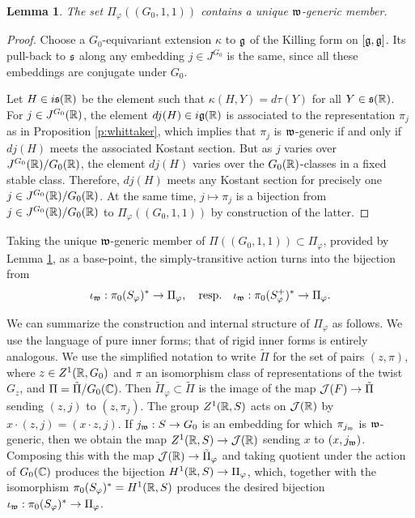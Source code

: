 \documentclass{article}
\newtheorem{lem}[thm]{Lemma}
\theoremstyle{definition}
\numberwithin{equation}{section}
\renewcommand{\-}{\hyp{}}
\begin{document}
\begin{lem} \label{lem:uniqgen}
The set $\Pi_\varphi((G_0,1,1))$ contains a unique $\mathfrak{w}$-generic member.
\end{lem}
\begin{proof}
Choose a $G_0$-equivariant extension $\kappa$ to $\mathfrak{g}$ of the Killing form on $[\mathfrak{g},\mathfrak{g}]$. Its pull-back to $\mathfrak{s}$ along any embedding $j \in J^{G_0}$ is the same, since all these embeddings are conjugate under $G_0$.

Let $H \in i\mathfrak{s}(\mathbb{R})$ be the element such that $\kappa(H,Y)=d\tau(Y)$ for all $Y \in \mathfrak{s}(\mathbb{R})$. For $j \in J^{G_0}(\mathbb{R})$, the element $dj(H) \in i\mathfrak{g}(\mathbb{R})$ is associated to the representation $\pi_j$ as in Proposition \ref{p:whittaker}, which implies that $\pi_j$ is $\mathfrak{w}$-generic if and only if $dj(H)$ meets the associated Kostant section. But as $j$ varies over $J^{G_0}(\mathbb{R})/G_0(\mathbb{R})$, the element $dj(H)$ varies over the $G_0(\mathbb{R})$-classes in a fixed stable class. Therefore, $dj(H)$ meets any Kostant section for precisely one $j \in J^{G_0}(\mathbb{R})/G_0(\mathbb{R})$. At the same time, $j \mapsto \pi_j$ is a bijection from $j \in J^{G_0}(\mathbb{R})/G_0(\mathbb{R})$ to $\Pi_\varphi((G_0,1,1))$ by construction of the latter.
\end{proof}

Taking the unique $\mathfrak{w}$-generic member of $\Pi((G_0,1,1)) \subset \Pi_\varphi$, provided by Lemma \ref{lem:uniqgen}, as a base-point, the simply-transitive action turns into the bijection from 
\[ \iota_{\mathfrak{w}} : \pi_0(S_\varphi)^* \to  \Pi_\varphi, \quad \textrm{resp.}\quad \iota_{\mathfrak{w}} : \pi_0(S_\varphi^+)^* \to \Pi_\varphi. \]

We can summarize the construction and internal structure of $\Pi_\varphi$ as follows. We use the language of pure inner forms; that of rigid inner forms is entirely analogous. We use the simplified notation to write $\tilde\Pi$ for the set of pairs $(z,\pi)$, where $z \in Z^1(\mathbb{R},G_0)$ and $\pi$ an isomorphism class of representations of the twist $G_z$, and $\Pi=\tilde\Pi/G_0(\mathbb{C})$. Then $\tilde\Pi_\varphi \subset \tilde\Pi$ is the image of the map $\mathcal{J}(F) \to \tilde\Pi$ sending $(z,j)$ to $(z,\pi_j)$. The group $Z^1(\mathbb{R},S)$ acts on $\mathcal{J}(\mathbb{R})$ by $x\cdot (z,j)=(x \cdot z,j)$. If $j_{\mathfrak{w}} : S \to G_0$ is an embedding for which $\pi_{j_{\mathfrak{w}}}$ is $\mathfrak{w}$-generic, then we obtain the map $Z^1(\mathbb{R},S) \to \mathcal{J}(\mathbb{R})$ sending $x$ to $(x,j_{\mathfrak{w}})$. Composing this with the map $\mathcal{J}(\mathbb{R}) \to \tilde\Pi_\varphi$ and taking quotient under the action of $G_0(\mathbb{C})$ produces the bijection $H^1(\mathbb{R},S) \to \Pi_\varphi$, which, together with the isomorphism $\pi_0(S_\varphi)^*=H^1(\mathbb{R},S)$ produces the desired bijection $\iota_{\mathfrak{w}} : \pi_0(S_\varphi)^* \to \Pi_\varphi$.
\end{document}
